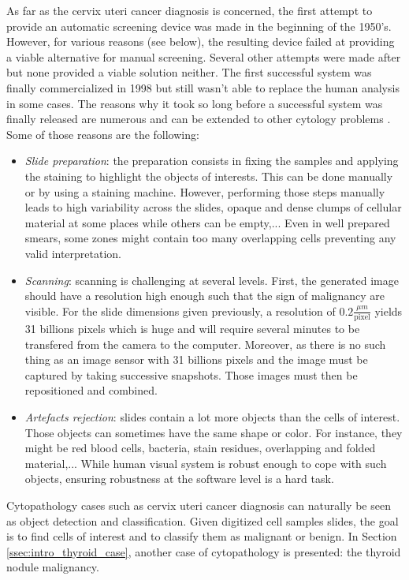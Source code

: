 As far as the cervix uteri cancer diagnosis is concerned, the first attempt to provide an automatic screening device was made in the beginning of the 1950's. However, for various reasons (see below), the resulting device failed at providing a viable alternative for manual screening. Several other attempts were made after but none provided a viable solution neither. The first successful system was finally commercialized in 1998 but still wasn't able to replace the human analysis in some cases. The reasons why it took so long before a successful system was finally released are numerous and can be extended to other cytology problems \cite{bengtsson2014screening}. Some of those reasons are the following:

\begin{itemize}
	\item \textit{Slide preparation}: the preparation consists in fixing the samples and applying the staining to highlight the objects of interests. This can be done manually or by using a staining machine. However, performing those steps manually leads to high variability across the slides, opaque and dense clumps of cellular material at some places while others can be empty,... Even in well prepared smears, some zones might contain too many overlapping cells preventing any valid interpretation. 
	\item \textit{Scanning}: scanning is challenging at several levels. First, the generated image should have a resolution high enough such that the sign of malignancy are visible. For the slide dimensions given previously, a resolution of $0.2 \frac{\mu m}{\text{pixel}}$ yields 31 billions pixels which is huge and will require several minutes to be transfered from the camera to the computer. Moreover, as there is no such thing as an image sensor with 31 billions pixels and the image must be captured by taking successive snapshots. Those images must then be repositioned and combined.
	\item \textit{Artefacts rejection}: slides contain a lot more objects than the cells of interest. Those objects can sometimes have the same shape or color. For instance, they might be red blood cells, bacteria, stain residues, overlapping and folded material,... While human visual system is robust enough to cope with such objects, ensuring robustness at the software level is a hard task.
\end{itemize}

Cytopathology cases such as cervix uteri cancer diagnosis can naturally be seen as object detection and classification. Given digitized cell samples slides, the goal is to find cells of interest and to classify them as malignant or benign. In Section \ref{ssec:intro_thyroid_case}, another case of cytopathology is presented: the thyroid nodule malignancy. 


